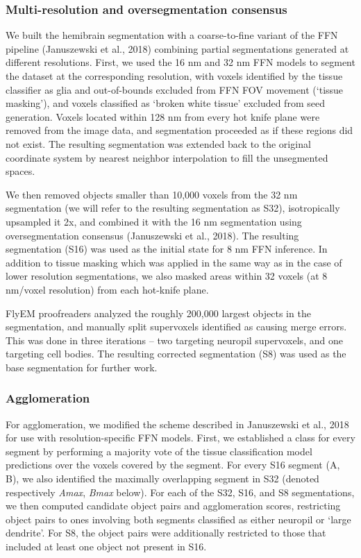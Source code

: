 \documentclass{article}
\begin{document}
\subsubsection*{Multi-resolution and oversegmentation consensus}

We built the hemibrain segmentation with a coarse-to-fine variant of the FFN pipeline (Januszewski et al., 2018) combining partial segmentations generated at different resolutions. First, we used the 16 nm and 32 nm FFN models to segment the dataset at the corresponding resolution, with voxels identified by the tissue classifier as glia and out-of-bounds excluded from FFN FOV movement (‘tissue masking’), and voxels classified as ‘broken white tissue’ excluded from seed generation. Voxels located within 128 nm from every hot knife plane were removed from the image data, and segmentation proceeded as if these regions did not exist. The resulting segmentation was extended back to the original coordinate system by nearest neighbor interpolation to fill the unsegmented spaces.

We then removed objects smaller than 10,000 voxels from the 32 nm segmentation (we will refer to the resulting segmentation as S32), isotropically upsampled it 2x, and combined it with the 16 nm segmentation using oversegmentation consensus (Januszewski et al., 2018). The resulting segmentation (S16) was used as the initial state for 8 nm FFN inference. In addition to tissue masking which was applied in the same way as in the case of lower resolution segmentations, we also masked areas within 32 voxels (at 8 nm/voxel resolution) from each hot-knife plane.

FlyEM proofreaders analyzed the roughly 200,000 largest objects in the segmentation, and manually split supervoxels identified as causing merge errors. This was done in three iterations – two targeting neuropil supervoxels, and one targeting cell bodies. The resulting corrected segmentation (S8) was used as the base segmentation for further work.

\subsubsection*{Agglomeration}

For agglomeration, we modified the scheme described in Januszewski et al., 2018 for use with resolution-specific FFN models. First, we established a class for every segment by performing a majority vote of the tissue classification model predictions over the voxels covered by the segment. For every S16 segment (A, B), we also identified the maximally overlapping segment in S32 (denoted respectively \emph{A}\emph{max}, \emph{B}\emph{max} below). For each of the S32, S16, and S8 segmentations, we then computed candidate object pairs and agglomeration scores, restricting object pairs to ones involving both segments classified as either neuropil or ‘large dendrite’. For S8, the object pairs were additionally restricted to those that included at least one object not present in S16.
\end{document}

